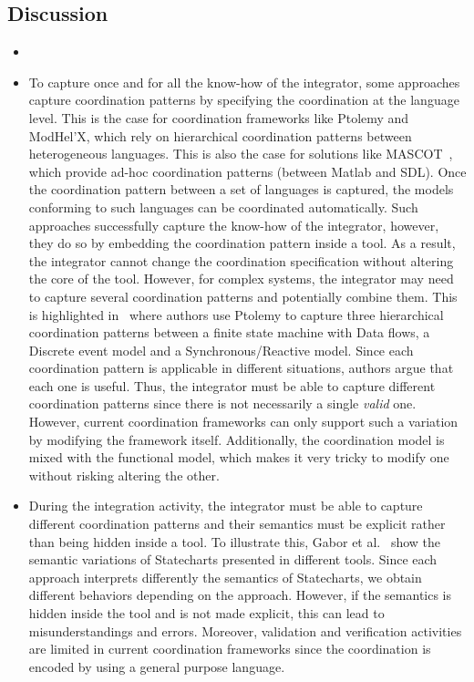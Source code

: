 \subsection{Discussion}
\begin{itemize}
	\item {}
	\item To capture once and for all the know-how of the integrator, some approaches capture coordination patterns by specifying the coordination at the language level. This is the case for coordination frameworks like Ptolemy and ModHel'X, which rely on hierarchical coordination patterns between heterogeneous languages. This is also the case for solutions like MASCOT~\cite{mascotbib}, which provide ad-hoc coordination patterns (\ie between Matlab and SDL). Once the coordination pattern between a set of languages is captured, the models conforming to such languages can be coordinated automatically. Such approaches successfully capture the know-how of the integrator, however, they do so by embedding the coordination pattern inside a tool. As a result, the integrator cannot change the coordination specification without altering the core of the tool. However, for complex systems, the integrator may need to capture several coordination patterns and potentially combine them. This is highlighted in~\cite{giraultcompo} where authors use Ptolemy to capture three hierarchical coordination patterns between a finite state machine with Data flows, a Discrete event model and a Synchronous/Reactive model. Since each coordination pattern is applicable in different situations, authors argue that each one is useful. Thus, the integrator must be able to capture different coordination patterns since there is not necessarily a single \emph{valid} one. However, current coordination frameworks can only support such a variation by modifying the framework itself. Additionally, the coordination model is mixed with the functional model, which makes it very tricky to modify one without risking altering the other.
	
	\item During the integration activity, the integrator must be able to capture different coordination patterns and their semantics must be explicit rather than being hidden inside a tool. To illustrate this, Gabor et al.~\cite{gaborpolyglot} show the semantic variations of Statecharts presented in different tools. Since each approach interprets differently the semantics of Statecharts, we obtain different behaviors depending on the approach. However, if the semantics is hidden inside the tool and is not made explicit, this can lead to misunderstandings and errors. Moreover, validation and verification activities are limited in current coordination frameworks since the coordination is encoded by using a general purpose language.
	

\end{itemize}
